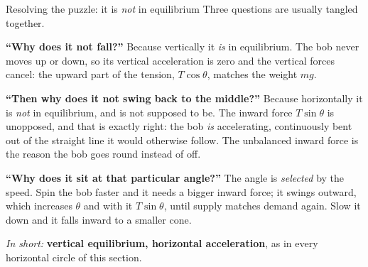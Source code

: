 \begin{motivbox}{Resolving the puzzle: it is \emph{not} in equilibrium}
Three questions are usually tangled together.

\smallskip
\textbf{``Why does it not fall?''} Because vertically it \emph{is} in equilibrium. The bob never moves
up or down, so its vertical acceleration is zero and the vertical forces cancel: the upward part of the
tension, $T\cos\theta$, matches the weight $mg$.

\smallskip
\textbf{``Then why does it not swing back to the middle?''} Because horizontally it is \emph{not} in
equilibrium, and is not supposed to be. The inward force $T\sin\theta$ is unopposed, and that is
exactly right: the bob \emph{is} accelerating, continuously bent out of the straight line it would
otherwise follow. The unbalanced inward force is the reason the bob goes round instead of off.

\smallskip
\textbf{``Why does it sit at that particular angle?''} The angle is \emph{selected} by the speed. Spin
the bob faster and it needs a bigger inward force; it swings outward, which increases $\theta$ and with
it $T\sin\theta$, until supply matches demand again. Slow it down and it falls inward to a smaller cone.

\smallskip
\emph{In short:} \textbf{vertical equilibrium, horizontal acceleration}, as in every horizontal circle
of this section.
\end{motivbox}

\begin{figure}[htbp]
\centering
{}
\end{figure}

